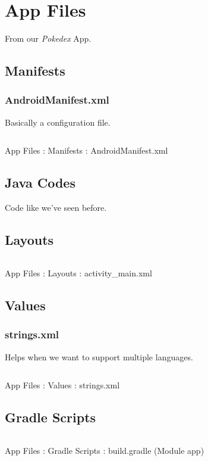 \section{App Files}
From our \emph{Pokedex} App.
\subsection{Manifests}
\subsubsection{AndroidManifest.xml}
Basically a configuration file.
\begin{code}
	\inputminted{xml}{codes/android/Pokedex/app/src/main/AndroidManifest.xml}
	\caption{App Files : Manifests : AndroidManifest.xml}
\end{code}
\subsection{Java Codes}
Code like we've seen before.
\subsection{Layouts}
\begin{code}
	\inputminted{xml}{codes/android/Pokedex/app/src/main/res/layout/activity_main.xml}
	\caption{App Files : Layouts : activity\_main.xml}
\end{code}
\subsection{Values}
\subsubsection{strings.xml}
Helps when we want to support multiple languages.
\begin{code}
	\inputminted{xml}{codes/android/Pokedex/app/src/main/res/values/strings.xml}
	\caption{App Files : Values : strings.xml}
\end{code}

\subsection{Gradle Scripts}
\begin{code}
	\inputminted{groovy}{codes/android/Pokedex/app/build.gradle}
	\caption{App Files : Gradle Scripts : build.gradle (Module app)}
\end{code}

